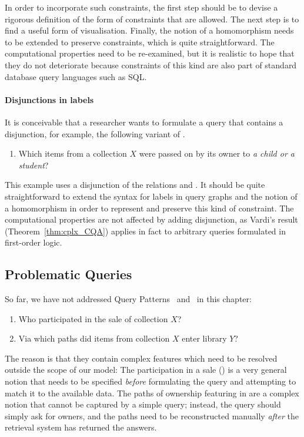 In order to incorporate such constraints,
the first step should be to devise a rigorous definition of the form of constraints that are allowed.
The next step is to find a useful form of visualisation.
Finally, the notion of a homomorphism needs to be extended to preserve constraints,
which is quite straightforward.
The computational properties need to be re-examined, but it is realistic to hope
that they do not deteriorate because constraints of this kind are also part of
standard database query languages such as \gls{SQL}.

\paragraph{Disjunctions in labels}

It is conceivable that a researcher wants to formulate a query that contains a disjunction,
for example, the following variant of .
%
\begin{enumerate}
  \item[\exaquery{4$'$}]
    Which items from a collection $X$ were passed on by its owner to \emph{a child or a student}?
\end{enumerate}
%
This example uses a disjunction of the relations  and .
It should be quite straightforward to extend the syntax for labels in query graphs
and the notion of a homomorphism in order to represent and preserve this kind of constraint.
The computational properties are not affected by adding disjunction,
as Vardi's result (Theorem~\ref{thm:cplx_CQA}) applies in fact to arbitrary queries formulated in first-order logic.

\subsection{Problematic Queries}

So far, we have not addressed Query Patterns~ and~ in this chapter:
%
\begin{enumerate}
  \item[\exaquery{6}]
    Who participated in the sale of collection $X$?
  \item[\exaquery{7}]
    Via which paths did items from collection $X$ enter library $Y$?
\end{enumerate}
%
The reason is that they contain complex features which need to be resolved outside the scope of our model:
The participation in a sale () is a very general notion that needs to be specified
\emph{before} formulating the query and attempting to match it to the available data.
The paths of ownership featuring in  are a complex notion that cannot be captured by a simple query;
instead, the query should simply ask for owners, and the paths need to be reconstructed manually
\emph{after} the retrieval system has returned the answers.

